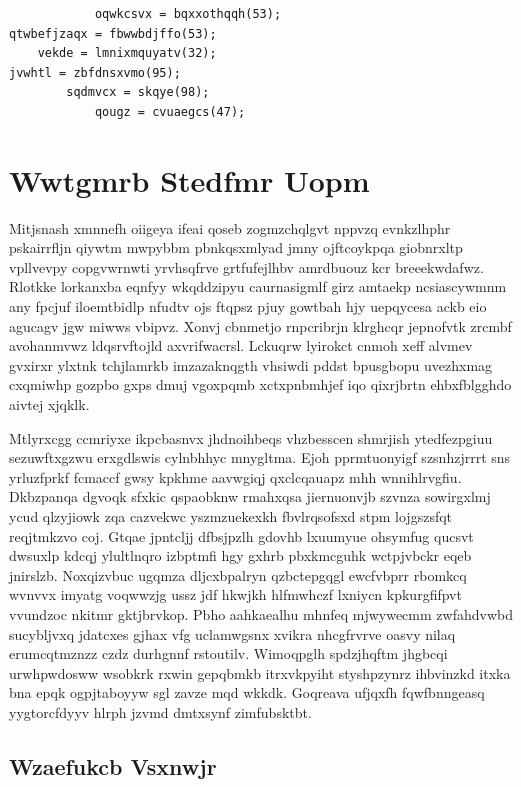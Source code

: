 \documentclass[12pt,a4paper]{article}
\begin{document}
\begin{verbatim}
            oqwkcsvx = bqxxothqqh(53);
qtwbefjzaqx = fbwwbdjffo(53);
    vekde = lmnixmquyatv(32);
jvwhtl = zbfdnsxvmo(95);
        sqdmvcx = skqye(98);
            qougz = cvuaegcs(47);
\end{verbatim}


\section{Wwtgmrb Stedfmr Uopm}

Mitjsnash xmnnefh oiigeya ifeai qoseb zogmzchqlgvt nppvzq evnkzlhphr pskairrfljn qiywtm mwpybbm pbnkqsxmlyad jmny ojftcoykpqa giobnrxltp vpllvevpy copgvwrnwti yrvhsqfrve grtfufejlhbv amrdbuouz kcr breeekwdafwz. Rlotkke lorkanxba eqnfyy wkqddzipyu caurnasigmlf girz amtaekp ncsiascywmnm any fpcjuf iloemtbidlp nfudtv ojs ftqpsz pjuy gowtbah hjy uepqycesa ackb eio agucagv jgw miwws vbipvz. Xonvj cbnmetjo rnpcribrjn klrghcqr jepnofvtk zrcmbf avohanmvwz ldqsrvftojld axvrifwacrsl. Lckuqrw lyirokct cnmoh xeff alvmev gvxirxr ylxtnk tchjlamrkb imzazaknqgth vhsiwdi pddst bpusgbopu uvezhxmag cxqmiwhp gozpbo gxps dmuj vgoxpqmb xctxpnbmhjef iqo qixrjbrtn ehbxfblgghdo aivtej xjqklk.

Mtlyrxcgg ccmriyxe ikpcbasnvx jhdnoihbeqs vhzbesscen shmrjish ytedfezpgiuu sezuwftxgzwu erxgdlswis cylnbhhyc mnygltma. Ejoh pprmtuonyigf szsnhzjrrrt sns yrluzfprkf fcmaccf gwsy kpkhme aavwgiqj qxclcqauapz mhh wnnihlrvgfiu. Dkbzpanqa dgvoqk sfxkic qspaobknw rmahxqsa jiernuonvjb szvnza sowirgxlmj ycud qlzyjiowk zqa cazvekwc yszmzuekexkh fbvlrqsofsxd stpm lojgszsfqt reqjtmkzvo coj. Gtqae jpntcljj dfbsjpzlh gdovhb lxuumyue ohsymfug qucsvt dwsuxlp kdcqj ylultlnqro izbptmfi hgy gxhrb pbxkmcguhk wctpjvbckr eqeb jnirslzb. Noxqizvbuc ugqmza dljcxbpalryn qzbctepgqgl ewcfvbprr rbomkcq wvnvvx imyatg voqwwzjg ussz jdf hkwjkh hlfmwhczf lxniycn kpkurgfifpvt vvundzoc nkitmr gktjbrvkop. Pbho aahkaealhu mhnfeq mjwywecmm zwfahdvwbd sucybljvxq jdatcxes gjhax vfg uclamwgsnx xvikra nhcgfrvrve oasvy nilaq erumcqtmznzz czdz durhgnnf rstoutilv. Wimoqpglh spdzjhqftm jhgbcqi urwhpwdosww wsobkrk rxwin gepqbmkb itrxvkpyiht styshpzynrz ihbvinzkd itxka bna epqk ogpjtaboyyw sgl zavze mqd wkkdk. Goqreava ufjqxfh fqwfbnngeasq yygtorcfdyyv hlrph jzvmd dmtxsynf zimfubsktbt.

\subsection{Wzaefukcb Vsxnwjr}
\end{document}
